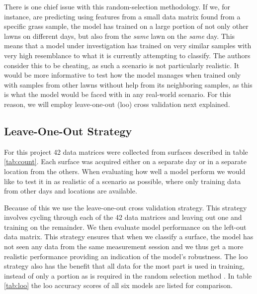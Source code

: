 There is one chief issue with this random-selection methodology. If we, for instance, are predicting using features from a small data matrix found from a specific grass sample, the model has trained on a large portion of not only other lawns on different days, but also from the \emph{same} lawn on the \emph{same} day. This means that a model under investigation has trained on very similar samples with very high resemblance to what it is currently attempting to classify. The authors consider this to be cheating, as such a scenario is not particularly realistic. It would be more informative to test how the model manages when trained only with samples from other lawns without help from its neighboring samples, as this is what the model would be faced with in any real-world scenario. For this reason, we will employ leave-one-out (\gls{loo}) cross validation next explained. 





\subsection{Leave-One-Out Strategy}


For this project 42 data matrices were collected from surfaces described in table \ref{tab:count}. Each surface was acquired either on a separate day or in a separate location from the others. When evaluating how well a model perform we would like to test it in as realistic of a scenario as possible, where only training data from other days and locations are available. 

Because of this we use the leave-one-out cross validation strategy. This strategy involves cycling through each of the 42 data matrices and leaving out one and training on the remainder. We then evaluate model performance on the left-out data matrix. This strategy ensures that when we classify a surface, the model has not seen any data from the same measurement session and we thus get a more realistic performance providing an indication of the model's robustness. The \gls{loo} strategy also has the benefit that all data for the most part is used in training, instead of only a portion as is required in the random selection method \citep{raschka}. In table \ref{tab:loo} the \gls{loo} accuracy scores of all six models are listed for comparison. 

